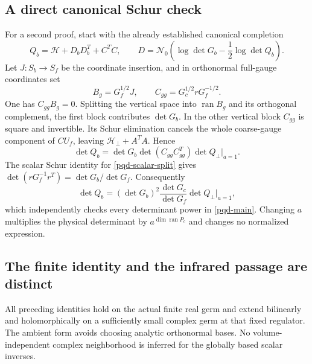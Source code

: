 \subsection{A direct canonical Schur check}
\label{pqd-schur-section}

For a second proof, start with the already established canonical
completion
\begin{equation}
 Q_b=\mathcal H+D_bD_b^T+C^TC,\qquad
 D=\mathcal N_0\left(\log\det G_b-\frac12\log\det Q_b\right).
 \label{pqd-canonical}
\end{equation}
Let $J:S_b\to S_f$ be the coordinate insertion, and in orthonormal
full-gauge coordinates set
\begin{equation}
 B_g=G_f^{1/2}J,\qquad C_{gg}=G_c^{1/2}rG_f^{-1/2}.
 \label{pqd-gauge-blocks}
\end{equation}
One has $C_{gg}B_g=0$. Splitting the vertical space into
$\operatorname{ran}B_g$ and its orthogonal complement, the first block
contributes $\det G_b$. In the other vertical block $C_{gg}$ is square
and invertible. Its Schur elimination cancels the whole coarse-gauge
component of $CU_f$, leaving $\mathcal H_\perp+A^TA$. Hence
\begin{equation}
 \det Q_b=\det G_b\det(C_{gg}C_{gg}^T)\det Q_\perp\big|_{a=1}.
 \label{pqd-schur1}
\end{equation}
The scalar Schur identity for \eqref{pqd-scalar-split} gives
$\det(rG_f^{-1}r^T)=\det G_b/\det G_f$. Consequently
\begin{equation}
 \det Q_b=(\det G_b)^2\frac{\det G_c}{\det G_f}
                                      \det Q_\perp\big|_{a=1},
 \label{pqd-schur2}
\end{equation}
which independently checks every determinant power in
\eqref{pqd-main}. Changing $a$ multiplies the physical determinant by
$a^{\dim\operatorname{ran}P_c}$ and changes no normalized expression.

\subsection{The finite identity and the infrared passage are distinct}
\label{pqd-scope}

All preceding identities hold on the actual finite real germ and extend
bilinearly and holomorphically on a sufficiently small complex germ at
that fixed regulator. The ambient form avoids choosing analytic
orthonormal bases. No volume-independent complex neighborhood is
inferred for the globally based scalar inverses.

